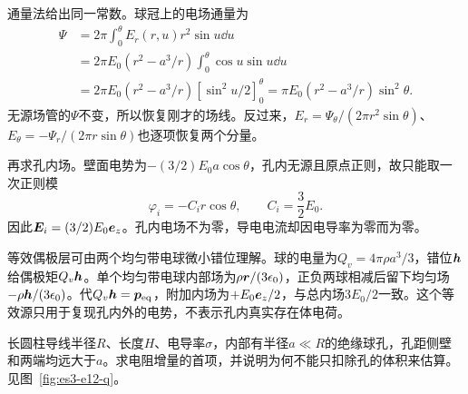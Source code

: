 \begin{solution}
通量法给出同一常数。球冠上的电场通量为
\[\begin{aligned}
\Psi&=2\pi\int_0^\theta E_r(r,u)r^2\sin u\dd u\\
&=2\pi E_0(r^2-a^3/r)\int_0^\theta\cos u\sin u\dd u\\
&=2\pi E_0(r^2-a^3/r)[\sin^2u/2]_0^\theta
=\pi E_0(r^2-a^3/r)\sin^2\theta.
\end{aligned}\]
无源场管的$\Psi$不变，所以恢复刚才的场线。反过来，$E_r=\Psi_\theta/(2\pi r^2\sin\theta)$、$E_\theta=-\Psi_r/(2\pi r\sin\theta)$也逐项恢复两个分量。

再求孔内场。壁面电势为$-(3/2)E_0a\cos\theta$，孔内无源且原点正则，故只能取一次正则模
\[\varphi_i=-C_i r\cos\theta,\qquad C_i=\frac32E_0.
\]
因此$\bm{E}_i=(3/2)E_0\bm{e}_z$。孔内电场不为零，导电电流却因电导率为零而为零。

等效偶极层可由两个均匀带电球微小错位理解。球的电量为$Q_v=4\pi\rho a^3/3$，错位$\bm{h}$给偶极矩$Q_v\bm{h}$。单个均匀带电球内部场为$\rho\bm{r}/(3\epsilon_0)$，正负两球相减后留下均匀场$-\rho\bm{h}/(3\epsilon_0)$。代$Q_v\bm{h}=\bm{p}_{\rm eq}$，附加内场为$+E_0\bm{e}_z/2$，与总内场$3E_0/2$一致。这个等效源只用于复现孔内外的电势，不表示孔内真实存在体电荷。
\end{solution}

\begin{example}[小球孔引起的导线电阻增量]\label{ex:es3-e12}
长圆柱导线半径$R$、长度$H$、电导率$\sigma$，内部有半径$a\ll R$的绝缘球孔，孔距侧壁和两端均远大于$a$。求电阻增量的首项，并说明为何不能只扣除孔的体积来估算。 见图~\ref{fig:es3-e12-q}。
\end{example}

